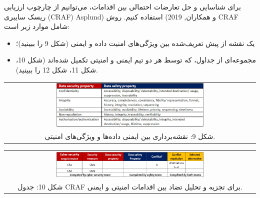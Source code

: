 \documentclass[a4paper,10pt]{article}
\begin{document}
                برای شناسایی و حل تعارضات احتمالی بین اقدامات، می‌توانیم از چارچوب ارزیابی ریسک سایبری (CRAF) Asplund) و همکاران, 2019) استفاده کنیم. روش CRAF شامل موارد زیر است:

                \begin{itemize}
                    
                    \item یک نقشه از پیش تعریف‌شده بین ویژگی‌های امنیت داده و ایمنی (شکل 9 را ببینید)؛

                    \item مجموعه‌ای از جداول، که توسط هر دو تیم ایمنی و امنیتی تکمیل شده‌اند (شکل 10، شکل 11، شکل 12 را ببینید).

                \end{itemize}

                \begin{table}
            
                    \centering
                    \begin{tabular}{ c }
                        
                        \includegraphics[width=0.6\textwidth]{Image/fig9.jpg} \\
        
                        شکل 9: نقشه‌برداری بین ایمنی داده‌ها و ویژگی‌های امنیتی.
        
                    \end{tabular}
        
                \end{table}

                \begin{table}
            
                    \centering
                    \begin{tabular}{ c }
                        
                        \includegraphics[width=0.6\textwidth]{Image/fig10.jpg} \\
        
                        شکل 10: جدول CRAF برای تجزیه و تحلیل تضاد بین اقدامات امنیتی و ایمنی.
        
                    \end{tabular}
        
                \end{table}
\end{document}
